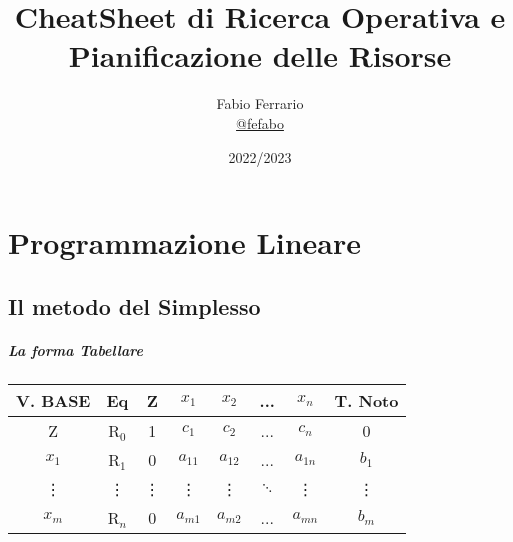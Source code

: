 \documentclass[12pt, a4paper, openany]{book}
\begin{document}
\title{CheatSheet di Ricerca Operativa e Pianificazione delle Risorse}

\author{
	Fabio Ferrario\\
	\small{\href{https://t.me/fefabo}{@fefabo}}
}
\date{2022/2023}

\maketitle

\tableofcontents

\chapter{Programmazione Lineare}
\section{Il metodo del Simplesso}

\paragraph*{La forma Tabellare}
\begin{center}
	\begin{tabular}{c|c|c|cccc|c}
		\small{V. BASE} & Eq     & Z      & $x_1$    & $x_2$    & ...      & $x_n$    & T. Noto \\
		\hline
		Z               & R$_0$  & 1      & $c_1$    & $c_2$    & ...      & $c_n$    & 0       \\
		$x_1$           & R$_1$  & 0      & $a_{11}$ & $a_{12}$ & ...      & $a_{1n}$ & $b_1$   \\
		\vdots          & \vdots & \vdots & \vdots   & \vdots   & $\ddots$ & \vdots   & \vdots  \\
		$x_m$           & R$_n$  & 0      & $a_{m1}$ & $a_{m2}$ & ...      & $a_{mn}$ & $b_m$   \\
	\end{tabular}
\end{center}
\end{document}
